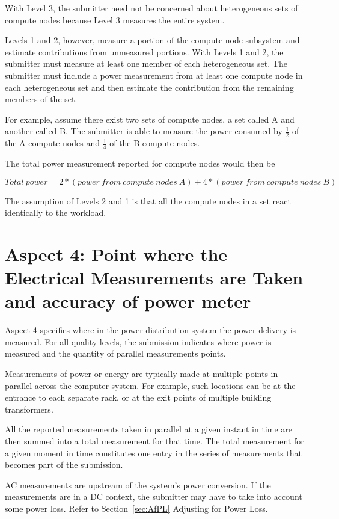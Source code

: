 \noindent
With Level 3, the submitter need not be concerned about heterogeneous sets of compute nodes because Level 3 measures the entire system. 
\wl

\noindent
Levels 1 and 2, however, measure a portion of the compute-node subsystem and estimate contributions from unmeasured portions. With Levels 1 and 2, the submitter must measure at least one member of each heterogeneous set. The submitter must include a power measurement from at least one compute node in each heterogeneous set and then estimate the contribution from the remaining members of the set. 
\wl

\noindent
For example, assume there exist two sets of compute nodes, a set called A and another called B.  The submitter is able to measure the power 
consumed by $ \frac{1}{2} $ of the A compute nodes and $ \frac{1}{4} $ of the B compute nodes.
\wl

\noindent
The total power measurement reported for compute nodes would then be 

\noindent
\[ Total~power=2*(power~from~compute~nodes~A) 
                              + 4*(power~from~compute~nodes~B) \]

\noindent
The assumption of Levels 2 and 1 is that all the compute nodes in a set react identically to the workload.


\section{Aspect 4: Point where the Electrical Measurements are Taken and accuracy of power meter}
\label{sec:A4wEMaT}
Aspect 4 specifies where in the power distribution system the power delivery is measured.  For all quality levels, the submission indicates where power is measured and the quantity of parallel measurements points.
\wl

\noindent
Measurements of power or energy are typically made at multiple points in parallel across the computer system. For example, such locations can be at the entrance to each separate rack, or at the exit points of multiple building transformers. 
\wl

\noindent
All the reported measurements taken in parallel at a given instant in time are then summed into a total measurement for that time.  The total measurement for a given moment in time constitutes one entry in the series of measurements that becomes part of the submission.
\wl

\noindent
AC measurements are upstream of the system's power conversion. If the measurements are in a DC context, the submitter may have to take into account some power loss. 
Refer to Section~\ref{sec:AfPL} Adjusting for Power Loss.
\wl

